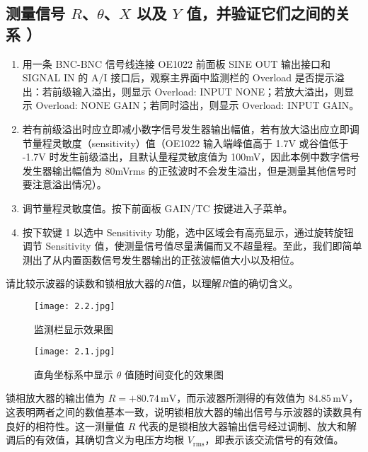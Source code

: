 \documentclass[dvipsnames, svgnames,a4paper,11pt]{article}
\begin{document}
\subsection{测量信号 $R$、$\theta$、$X$ 以及 $Y$ 值，并验证它们之间的关系
）}
\begin{enumerate}
    \item 用一条 BNC-BNC 信号线连接 OE1022 前面板 SINE OUT 输出接口和 SIGNAL IN 的 A/I 接口后，观察主界面中监测栏的 Overload 是否提示溢出：若前级输入溢出，则显示 Overload: INPUT NONE；若放大溢出，则显示 Overload: NONE GAIN；若同时溢出，则显示 Overload: INPUT GAIN。
    
    \item 若有前级溢出时应立即减小数字信号发生器输出幅值，若有放大溢出应立即调节量程灵敏度（sensitivity）值（OE1022 输入端峰值高于 1.7V 或谷值低于 -1.7V 时发生前级溢出，且默认量程灵敏度值为 100mV，因此本例中数字信号发生器输出幅值为 80mVrms 的正弦波时不会发生溢出，但是测量其他信号时要注意溢出情况）。
    
    \item 调节量程灵敏度值。按下前面板 GAIN/TC 按键进入子菜单。
    
    \item 按下软键 1 以选中 Sensitivity 功能，选中区域会有高亮显示，通过旋转旋钮调节 Sensitivity 值，使测量信号值尽量满偏而又不超量程。至此，我们即简单测出了从内置函数信号发生器输出的正弦波幅值大小以及相位。
\end{enumerate}
\begin{question}
	请比较示波器的读数和锁相放大器的$R$值，以理解$R$值的确切含义。
\end{question}
\begin{figure}[htbp]
    \centering
    \begin{minipage}{0.45\textwidth}
        \centering
        \texttt{[image: 2.2.jpg]}
        \caption{监测栏显示效果图}
        \label{fig:monitoring_display}
    \end{minipage}
    \hfill
    \begin{minipage}{0.45\textwidth}
        \centering
        \texttt{[image: 2.1.jpg]}
        \caption{直角坐标系中显示 $\theta$ 值随时间变化的效果图}
        \label{fig:theta_time_variation}
    \end{minipage}
\end{figure}

锁相放大器的输出值为 \( R = +80.74 \, \text{mV} \)，而示波器所测得的有效值为 \( 84.85 \, \text{mV} \)，这表明两者之间的数值基本一致，说明锁相放大器的输出信号与示波器的读数具有良好的相符性。这一测量值 \( R \) 代表的是锁相放大器输出信号经过调制、放大和解调后的有效值，其确切含义为电压方均根 \( V_{\text{rms}} \)，即表示该交流信号的有效值。
\end{document}

